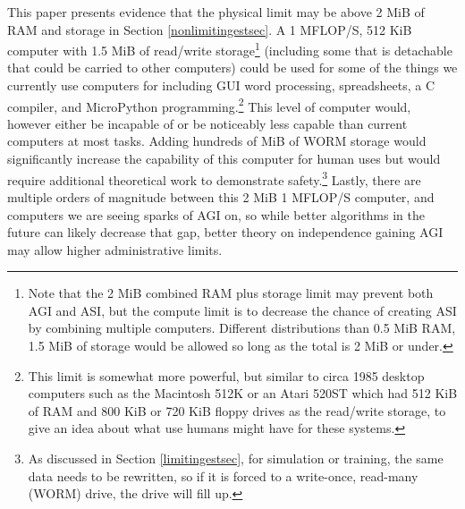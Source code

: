 \documentclass[letterpaper,twocolumn]{article}
\begin{document}

This paper presents evidence that the physical limit may be above 2
MiB of RAM and storage in Section \ref{nonlimitingestsec}.  A 1
MFLOP/S, 512 KiB computer with 1.5 MiB of read/write
storage\footnote{Note that the 2 MiB combined RAM plus storage limit
may prevent both AGI and ASI, but the compute limit is to decrease the
chance of creating ASI by combining multiple computers. Different
distributions than 0.5 MiB RAM, 1.5 MiB of storage would be allowed so
long as the total is 2 MiB or under.}  (including some that is
detachable that could be carried to other computers) could be used for
some of the things we currently use computers for including GUI word
processing, spreadsheets, a C compiler, and MicroPython
programming.\footnote{This limit is somewhat more powerful, but
similar to circa 1985 desktop computers such as the Macintosh 512K or
an Atari 520ST which had 512 KiB of RAM and 800 KiB or 720 KiB floppy
drives as the read/write storage, to give an idea about what use
humans might have for these systems.} This level of computer would,
however either be incapable of or be noticeably less capable than
current computers at most tasks. Adding hundreds of MiB of WORM
storage would significantly increase the capability of this computer
for human uses but would require additional theoretical work to
demonstrate safety.\footnote{As discussed in Section
\ref{limitingestsec}, for simulation or training, the same data needs
to be rewritten, so if it is forced to a write-once, read-many (WORM)
drive, the drive will fill up.} Lastly, there are multiple orders of
magnitude between this 2 MiB 1 MFLOP/S computer, and computers we are
seeing sparks of AGI on, so while better algorithms in the future can
likely decrease that gap, better theory on independence gaining AGI
may allow higher administrative limits.
\end{document}
